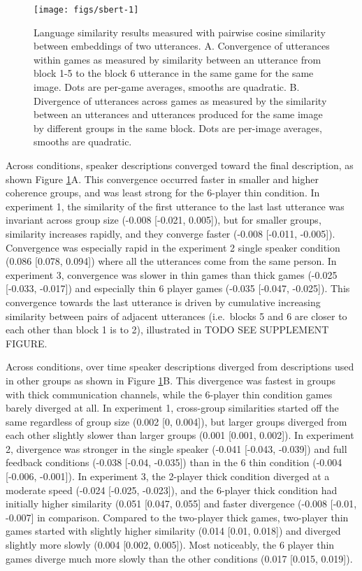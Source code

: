 \documentclass[
  english,
  a4paper,
]{article}
\begin{document}
\begin{figure}[t!]

{\centering \texttt{[image: figs/sbert-1]} 

}

\caption{Language similarity results measured with pairwise cosine similarity between embeddings of two utterances. A. Convergence of utterances within games as measured by similarity between an utterance from block 1-5 to the block 6 utterance in the same game for the same image. Dots are per-game averages, smooths are quadratic. B. Divergence of utterances across games as measured by the similarity between an utterances and utterances produced for the same image by different groups in the same block. Dots are per-image averages, smooths are quadratic.}\label{fig:sbert}
\end{figure}

Across conditions, speaker descriptions converged toward the final description, as shown Figure \ref{fig:sbert}A. This convergence occurred faster in smaller and higher coherence groups, and was least strong for the 6-player thin condition. In experiment 1, the similarity of the first utterance to the last last utterance was invariant across group size (-0.008 {[}-0.021, 0.005{]}), but for smaller groups, similarity increases rapidly, and they converge faster (-0.008 {[}-0.011, -0.005{]}). Convergence was especially rapid in the experiment 2 single speaker condition (0.086 {[}0.078, 0.094{]}) where all the utterances come from the same person. In experiment 3, convergence was slower in thin games than thick games (-0.025 {[}-0.033, -0.017{]}) and especially thin 6 player games (-0.035 {[}-0.047, -0.025{]}). This convergence towards the last utterance is driven by cumulative increasing similarity between pairs of adjacent utterances (i.e.~blocks 5 and 6 are closer to each other than block 1 is to 2), illustrated in TODO SEE SUPPLEMENT FIGURE.

Across conditions, over time speaker descriptions diverged from descriptions used in other groups as shown in Figure \ref{fig:sbert}B. This divergence was fastest in groups with thick communication channels, while the 6-player thin condition games barely diverged at all.
In experiment 1, cross-group similarities started off the same regardless of group size (0.002 {[}0, 0.004{]}), but larger groups diverged from each other slightly slower than larger groups (0.001 {[}0.001, 0.002{]}). In experiment 2, divergence was stronger in the single speaker (-0.041 {[}-0.043, -0.039{]}) and full feedback conditions (-0.038 {[}-0.04, -0.035{]}) than in the 6 thin condition (-0.004 {[}-0.006, -0.001{]}). In experiment 3, the 2-player thick condition diverged at a moderate speed (-0.024 {[}-0.025, -0.023{]}), and the 6-player thick condition had initially higher similarity (0.051 {[}0.047, 0.055{]} and faster divergence (-0.008 {[}-0.01, -0.007{]} in comparison. Compared to the two-player thick games, two-player thin games started with slightly higher similarity (0.014 {[}0.01, 0.018{]}) and diverged slightly more slowly (0.004 {[}0.002, 0.005{]}). Most noticeably, the 6 player thin games diverge much more slowly than the other conditions (0.017 {[}0.015, 0.019{]}).
\end{document}
